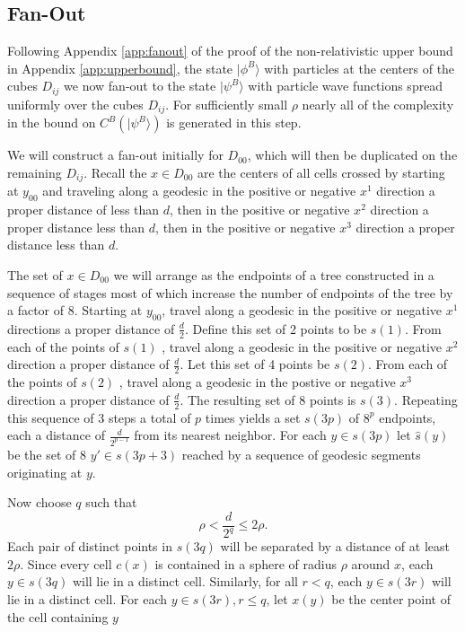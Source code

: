 \documentclass[12pt,amsmath,amssymb,onecolumn]{revtex4-2}
\begin{document}
\subsection{\label{app:fanoutr}Fan-Out}

Following Appendix \ref{app:fanout} of the proof of the
non-relativistic upper bound in Appendix \ref{app:upperbound},
the state $|\phi^B \rangle $ with particles at the centers of the cubes $D_{ij}$ we now fan-out
to the state $|\psi^B \rangle $ with particle wave functions spread uniformly over the
cubes $D_{ij}$. For sufficiently small $\rho$ nearly all of the complexity in
the bound on 
$C^B(|\psi^B \rangle )$ is generated in this step.

We will construct a fan-out initially for $D_{00}$, which will then
be duplicated on the remaining $D_{ij}$.  Recall the $x \in D_{00}$ are
the centers of all cells crossed by starting at $y_{00}$ and
traveling along a geodesic in the positive or negative $x^1$ direction
a proper distance of less than $d$,
then in the positive or negative $x^2$ direction a proper distance less than
$d$, then in the positive
or negative $x^3$ direction a proper distance less than $d$.

The set of $x \in D_{00}$ we will
arrange as the endpoints of a tree constructed in
a sequence of stages most of which increase the
number of endpoints of the tree by a factor of 8.
Starting at $y_{00}$, travel along
a geodesic in the positive or negative $x^1$ directions a proper distance
of $\frac{d}{2}$. Define this set of 2 points to be
$s(1)$. From each of the points of $s(1)$ , travel along a
geodesic in the positive or negative $x^2$ direction a proper distance
of $\frac{d}{2}$. Let this set of 4 points be $s(2)$. From each of
the points of $s(2)$ , travel along a geodesic
in the postive or negative $x^3$ direction a proper distance of $\frac{d}{2}$.
The resulting set of 8 points is $s(3)$.
Repeating this sequence of 3 steps a total of $p$ times yields a set $s(3p)$ of
$8^p$ endpoints, each a distance of $\frac{d}{2^{p-1}}$ from its nearest neighbor.
For each $y \in s(3p)$ let $\hat{s}(y)$ be the set of 8 $y' \in s(3p +3)$ reached by
a sequence of geodesic segments originating at $y$.

Now choose $q$ such that
\begin{equation}
  \label{choosep}
  \rho < \frac{d}{2^q} \le 2 \rho.
\end{equation}
Each pair of distinct points in $s(3q)$ will be separated by a distance of at least $2 \rho$.
Since every cell $c(x)$ is contained in a sphere of radius $\rho$ around $x$, each $y \in s(3q)$ will
lie in a distinct cell. Similarly, for all $r < q$, each $y \in s(3r)$ will lie in a distinct cell.
For each $y \in s(3r), r \le q$, let $x(y)$ be the center point of the cell containing $y$ 
\end{document}
